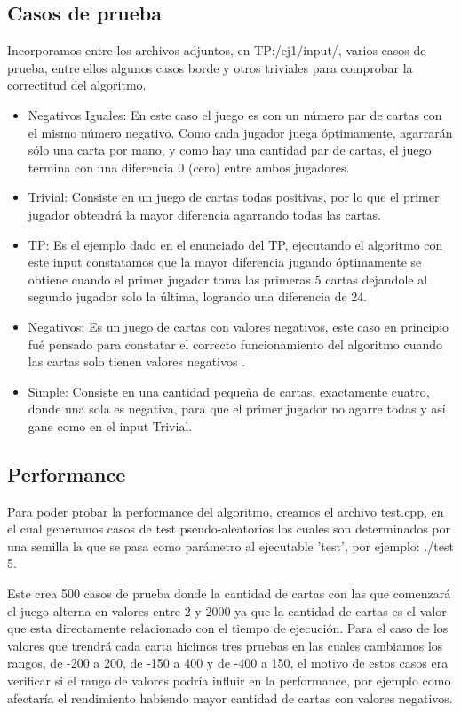 \subsection{Casos de prueba}

Incorporamos entre los archivos adjuntos, en TP:/ej1/input/, varios casos de prueba, entre ellos algunos casos borde y otros triviales para comprobar la correctitud del algoritmo.

\begin{itemize}
\item Negativos Iguales: En este caso el juego es con un n\'umero par de cartas con el mismo n\'umero negativo. Como cada jugador juega \'optimamente, agarrar\'an s\'olo una carta por mano, y como hay una cantidad par de cartas, el juego termina con una diferencia 0 (cero) entre ambos jugadores.
\item Trivial: Consiste en un juego de cartas todas positivas, por lo que el primer jugador obtendr\'a la mayor diferencia agarrando todas las cartas.
\item TP: Es el ejemplo dado en el enunciado del TP, ejecutando el algoritmo con este input constatamos que la mayor diferencia jugando \'optimamente se obtiene cuando el primer jugador toma las primeras 5 cartas dejandole al segundo jugador solo la \'ultima, logrando una  diferencia de 24.   
\item Negativos: Es un juego de cartas con valores negativos, este caso en principio fu\'e pensado para constatar el correcto funcionamiento del algoritmo cuando las cartas solo tienen valores negativos . 
\item Simple: Consiste en una cantidad peque\~na de cartas, exactamente cuatro, donde una sola es negativa, para que el primer jugador no agarre todas y as\'i gane como en el input Trivial.
\end{itemize}

\newpage


\subsection{Performance}


Para poder probar la performance del algoritmo, creamos el archivo test.cpp, en el cual generamos casos de test pseudo-aleatorios los cuales son determinados por una semilla la que se pasa como par\'ametro al ejecutable 'test', por ejemplo: ./test 5.

Este crea 500 casos de prueba donde la cantidad de cartas con las que comenzar\'a el juego alterna en valores entre 2 y 2000 ya que la cantidad de cartas es el valor que esta directamente relacionado con el tiempo de ejecuci\'on. Para el caso de los valores que trendr\'a cada carta hicimos tres pruebas en las cuales cambiamos los rangos, de -200 a 200, de -150 a 400 y de -400 a 150, el motivo de estos casos era verificar si el rango de valores podr\'ia influir en la performance, por ejemplo como afectar\'ia el rendimiento habiendo mayor cantidad de cartas con valores negativos. 

